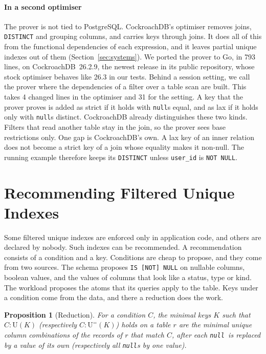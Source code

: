 \documentclass[conference]{IEEEtran}
\newtheorem{proposition}[theorem]{Proposition}
\theoremstyle{definition}
\newcommand{\sql}[1]{\texttt{#1}}
\newcommand{\nul}{\texttt{null}}
\newcommand{\U}[1]{\mathrm{U}(#1)}
\newcommand{\Ueq}[1]{\mathrm{U}^{=}(#1)}
\newif\ifextended
\begin{document}
\paragraph*{In a second optimiser} The prover is not tied to PostgreSQL. CockroachDB's optimiser removes joins,
\sql{DISTINCT} and grouping columns, and carries keys through joins. It does all of this from the functional
dependencies of each expression, and it leaves partial unique indexes out of them (Section~\ref{sec:systems}). We ported
the prover to Go, in 793 lines, on CockroachDB~26.2.9, the newest release in its public repository, whose stock
optimiser behaves like 26.3 in our tests. Behind a session setting, we call the prover where the dependencies of a
filter over a table scan are built. This takes 4 changed lines in the optimiser and 31 for the setting. A key that the
prover proves is added as strict if it holds with \nul s equal, and as lax if it holds only with \nul s distinct.
CockroachDB already distinguishes these two kinds. Filters that read another table stay in the join, so the prover sees
base restrictions only. One gap is CockroachDB's own. A lax key of an inner relation does not become a strict key of a
join whose equality makes it non-null. The running example therefore keeps its \sql{DISTINCT} unless \sql{user\_id} is
\sql{NOT NULL}.

\ifextended
\section{Recommending Filtered Unique Indexes}\label{sec:discovery}

Some filtered unique indexes are enforced only in application code, and others are declared by nobody. Such indexes
can be recommended. A recommendation consists of a condition and a key. Conditions are cheap to propose, and they come
from two sources. The schema proposes \sql{IS [NOT] NULL} on nullable columns, boolean values, and the values of columns
that look like a status, type or kind. The workload proposes the atoms that its queries apply to the table. Keys under a
condition come from the data, and there a reduction does the work.

\begin{proposition}[Reduction]\label{prop:reduce}
For a condition $C$, the minimal keys $K$ such that $C:\U{K}$ (respectively $C:\Ueq{K}$) holds on
a table $r$ are the minimal unique column combinations of the records of $r$ that match $C$,
after each \nul\ is replaced by a value of its own (respectively all \nul s by one value).
\end{proposition}
\end{document}
